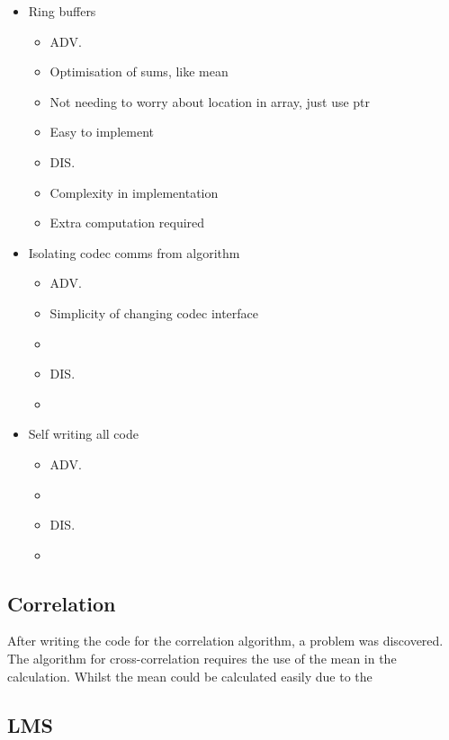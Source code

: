 \begin{itemize}
\item Ring buffers
	\begin{itemize}
	\item ADV.
	\item Optimisation of sums, like mean
	\item Not needing to worry about location in array, just use ptr
	\item Easy to implement
	\item DIS.
	\item Complexity in implementation
	\item Extra computation required
	\end{itemize}
\item Isolating codec comms from algorithm
	\begin{itemize}
	\item ADV.
	\item Simplicity of changing codec interface
	\item 
	\item DIS.
	\item 
	\end{itemize}
\item Self writing all code
	\begin{itemize}
	\item ADV.
	\item 
	\item DIS.
	\item 
	\end{itemize}
\end{itemize}

\subsection{Correlation}

After writing the code for the correlation algorithm, a problem was discovered.
The algorithm for cross-correlation requires the use of the mean in the calculation.
Whilst the mean could be calculated easily due to the 

\subsection{LMS}


